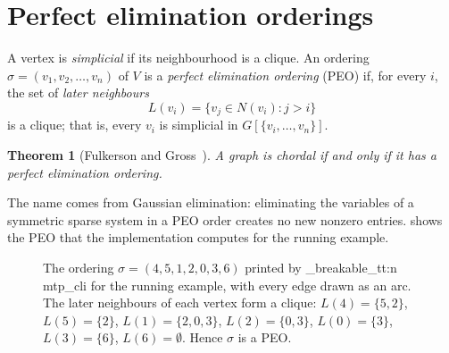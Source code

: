 \documentclass[11pt,a4paper,oneside]{report}
\theoremstyle{plain}
\newtheorem{theorem}{Theorem}[chapter]
\theoremstyle{definition}
\theoremstyle{remark}
\DeclareRobustCommand{\file}[1]{\mtp_breakable_tt:n {#1}}
\begin{document}
\section{Perfect elimination orderings}\label{sec:peo}
\begin{definition}
A vertex is \emph{simplicial} if its neighbourhood is a clique. An ordering
\(\sigma=(v_1,v_2,\dots,v_n)\) of \(V\) is a \emph{perfect elimination ordering} (PEO) if, for
every \(i\), the set of \emph{later neighbours}
\[ L(v_i)=\{v_j\in N(v_i) : j>i\} \]
is a clique; that is, every \(v_i\) is simplicial in \(G[\{v_i,\dots,v_n\}]\).
\end{definition}

\begin{theorem}[Fulkerson and Gross~\cite{fulkerson1965}]\label{thm:fg}
A graph is chordal if and only if it has a perfect elimination ordering.
\end{theorem}

The name comes from Gaussian elimination: eliminating the variables of a symmetric sparse
system in a PEO order creates no new nonzero entries.  shows the PEO that the
implementation computes for the running example.

\begin{figure}[ht]
\centering
{}
\caption[A perfect elimination ordering of the running example]{The ordering \(\sigma=(4,5,1,2,0,3,6)\) printed by \file{mtp_cli} for the running
example, with every edge drawn as an arc. The later neighbours of each vertex form a clique:
\(L(4)=\{5,2\}\), \(L(5)=\{2\}\), \(L(1)=\{2,0,3\}\), \(L(2)=\{0,3\}\), \(L(0)=\{3\}\),
\(L(3)=\{6\}\), \(L(6)=\emptyset\). Hence \(\sigma\) is a PEO.}
\label{fig:peo}
\end{figure}
\end{document}
